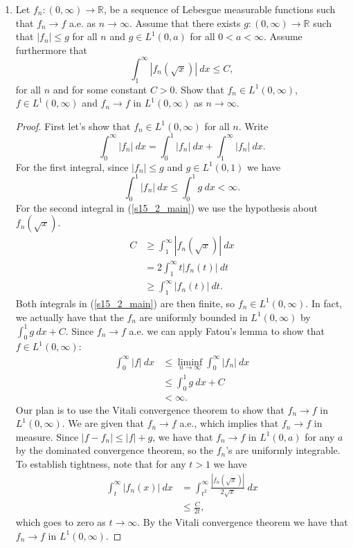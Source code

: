 \documentclass[11pt,letterpaper]{report}
\newcommand{\reals}{\mathbb{R}}
\begin{document}
\begin{enumerate}
	\item Let $f_n: (0, \infty)\to \reals$, be a sequence of Lebesgue measurable functions such that $f_n\to f$ a.e. as $n\to \infty$. Assume that there exists $g: (0, \infty)\to \reals$ such that $|f_n|\leq g$ for all $n$ and $g\in L^1(0, a)$ for all $0<a<\infty$. Assume furthermore that
	\[
	\int_1^\infty |f_n(\sqrt{x})|\ dx\leq C,
	\]
	for all $n$ and for some constant $C>0$. Show that $f_n\in L^1(0, \infty)$, $f\in L^1(0, \infty)$ and $f_n\to f$ in $L^1(0, \infty)$ as $n\to \infty$.
	\begin{proof}
		First let's show that $f_n\in L^1(0, \infty)$ for all $n$. Write
		\begin{equation}\label{s15_2_main}
		\int_0^\infty |f_n|\ dx = \int_0^1|f_n|\ dx + \int_1^\infty |f_n|\ dx.
		\end{equation}
		For the first integral, since $|f_n| \leq g$ and $g\in L^1(0, 1)$ we have
		\[
		\int_0^1|f_n|\ dx \leq \int_0^1 g\ dx <\infty.
		\]
		For the second integral in (\ref{s15_2_main}) we use the hypothesis about $f_n(\sqrt{x})$.
		\begin{align*}
			C &\geq \int_1^\infty |f_n(\sqrt{x})|\ dx\\
			&= 2\int_1^\infty t|f_n(t)|\ dt\\
			&\geq \int_1^\infty |f_n(t)|\ dt.
		\end{align*}
		Both integrals in (\ref{s15_2_main}) are then finite, so $f_n\in L^1(0, \infty)$. In fact, we actually have that the $f_n$ are uniformly bounded in $L^1(0, \infty)$ by $\int_0^1g\ dx + C$. Since $f_n\to f$ a.e. we can apply Fatou's lemma to show that $f\in L^1(0, \infty)$:
		\begin{align*}
			\int_0^\infty |f|\ dx &\leq \liminf_{n\to \infty}\int_0^\infty |f_n|\ dx\\
			&\leq \int_0^1 g\ dx + C\\
			&<\infty.
		\end{align*}
		Our plan is to use the Vitali convergence theorem to show that $f_n\to f$ in $L^1(0, \infty)$. We are given that $f_n\to f$ a.e., which implies that $f_n\to f$ in measure. Since $|f-f_n| \leq |f| + g$, we have that $f_n\to f$ in $L^1(0,a)$ for any $a$ by the dominated convergence theorem, so the $f_n$'s are uniformly integrable. To establish tightness, note that for any $t>1$ we have
		\begin{align*}
			\int_t^\infty |f_n(x)|\ dx &= \int_{t^2}^\infty\frac{|f_n(\sqrt{x})|}{2\sqrt{x}}\ dx\\
			&\leq \frac{C}{2t},
		\end{align*}
		which goes to zero as $t\to \infty$. By the Vitali convergence theorem we have that $f_n\to f$ in $L^1(0, \infty)$.
	\end{proof}


\end{enumerate}
\end{document}

